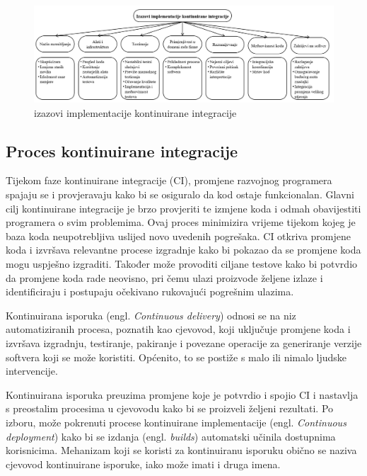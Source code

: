 \documentclass[a4paper,12pt,oneside]{article}
\begin{document}
\begin{figure}[ht!] %
	\centering %
	\includegraphics[scale=0.44]{./Slike/izazovi implementacije kontinuirane integracije.png} %
	\caption{izazovi implementacije kontinuirane integracije \cite{challenges} \label{f:izazovi implementacije kontinuirane integracije}} %
\end{figure}

\subsection{Proces kontinuirane integracije}
Tijekom faze kontinuirane integracije (CI), promjene razvojnog programera spajaju se i provjeravaju kako bi se osiguralo da kod ostaje funkcionalan. Glavni cilj kontinuirane integracije je brzo provjeriti te izmjene koda i odmah obavijestiti programera o svim problemima. Ovaj proces minimizira vrijeme tijekom kojeg je baza koda neupotrebljiva uslijed novo uvedenih pogrešaka. CI otkriva promjene koda i izvršava relevantne procese izgradnje kako bi pokazao da se promjene koda mogu uspješno izgraditi. Također može provoditi ciljane testove kako bi potvrdio da promjene koda rade neovisno, pri čemu ulazi proizvode željene izlaze i identificiraju i postupaju očekivano rukovajući pogrešnim ulazima.

Kontinuirana isporuka (engl. \textit{Continuous delivery}) odnosi se na niz automatiziranih procesa, poznatih kao cjevovod, koji uključuje promjene koda i izvršava izgradnju, testiranje, pakiranje i povezane operacije za generiranje verzije softvera koji se može koristiti. Općenito, to se postiže s malo ili nimalo ljudske intervencije.

Kontinuirana isporuka preuzima promjene koje je potvrdio i spojio CI i nastavlja s preostalim procesima u cjevovodu kako bi se proizveli željeni rezultati. Po izboru, može pokrenuti procese kontinuirane implementacije (engl. \textit{Continuous deployment}) kako bi se izdanja (engl. \textit{builds}) automatski učinila dostupnima korisnicima. Mehanizam koji se koristi za kontinuiranu isporuku obično se naziva cjevovod kontinuirane isporuke, iako može imati i druga imena.
\end{document}
